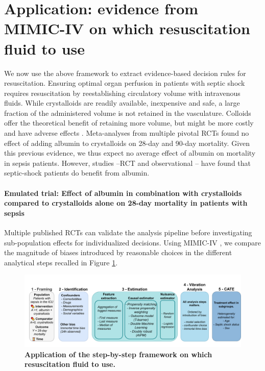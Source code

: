 \documentclass[10pt,letterpaper]{article}
\begin{document}
\section*{Application: evidence from MIMIC-IV on which resuscitation fluid to use}%
\label{sec:application_on_mimic_iv}

We now use the above framework to extract evidence-based decision rules for
resuscitation. Ensuring optimal organ perfusion in patients with septic shock
requires resuscitation by reestablishing circulatory volume with intravenous
fluids. While crystalloids are readily available, inexpensive and safe, a
large fraction of the administered volume is not retained in the vasculature.
Colloids offer the theoretical benefit of retaining more volume, but might be
more costly and have adverse effects \cite{annane2013effects}. Meta-analyses
from multiple pivotal RCTs found no effect of adding albumin to crystalloids
\cite{xu2014comparison,li2020resuscitation} on 28-day and 90-day mortality.  Given this
previous evidence, we thus expect no average effect of albumin on mortality in
sepsis patients. However, studies --RCT \cite{caironi2014albumin}  and observational
\cite{zhou2021early}-- have
found that septic-shock patients do benefit from albumin.

\paragraph{Emulated trial: Effect of albumin in combination with crystalloids
  compared to crystalloids alone on 28-day mortality in patients with sepsis}\label{emulated_trial}

Multiple published RCTs can validate the analysis pipeline before
investigating sub-population effects for individualized decisions. Using
MIMIC-IV \cite{johnson2020mimic}, we compare the magnitude of biases introduced by reasonable
choices in the different analytical steps recalled in Figure \ref{fig:study_summary}.

\begin{figure}[h!]
  \centering
  \includegraphics[width=\linewidth]{img/applied_inference_flow.pdf}
  \caption{\textbf{Application of the step-by-step framework on which resuscitation fluid to use.}}\label{fig:study_summary}
\end{figure}
\end{document}
